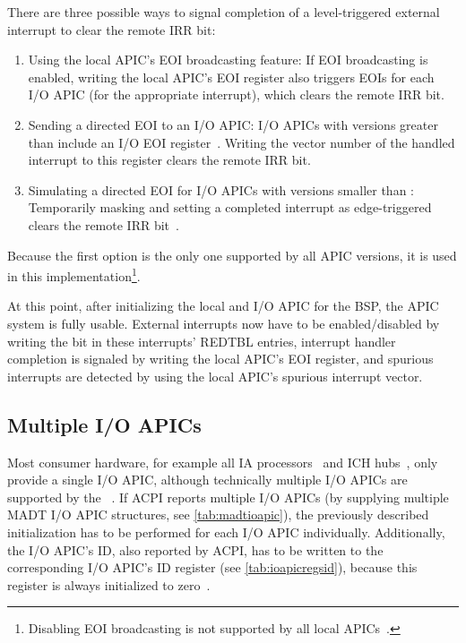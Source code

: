 There are three possible ways to signal completion of a level-triggered external interrupt to clear the remote IRR bit:

\begin{enumerate}
  \item Using the local APIC's EOI broadcasting feature: If EOI broadcasting is enabled, writing the local APIC's EOI register also triggers EOIs for each I/O APIC (for the appropriate interrupt), which clears the remote IRR bit.
  \item Sending a directed EOI to an I/O APIC\@: I/O APICs with versions greater than  include an I/O EOI register~\autocite[sec.~9.5.5]{ich5}.
        Writing the vector number of the handled interrupt to this register clears the remote IRR bit.
  \item Simulating a directed EOI for I/O APICs with versions smaller than : Temporarily masking and setting a completed interrupt as edge-triggered clears the remote IRR bit~\autocite[io\textunderscore{}apic.c]{linux}.
\end{enumerate}

Because the first option is the only one supported by all APIC versions, it is used in this implementation\footnote{
  Disabling EOI broadcasting is not supported by all local APICs~\autocite[sec.~3.11.8.5]{ia32}.}.

At this point, after initializing the local and I/O APIC for the BSP, the APIC system is fully usable.
External interrupts now have to be enabled/disabled by writing the  bit in these interrupts' REDTBL entries, interrupt handler completion is signaled by writing the local APIC's EOI register, and spurious interrupts are detected by using the local APIC's spurious interrupt vector.

\subsection{Multiple I/O APICs}
\label{subsec:multiioapic}

Most consumer hardware, for example all IA processors~\autocite{ia32} and ICH hubs~\autocite{ich5}, only provide a single I/O APIC, although technically multiple I/O APICs are supported by the ~\autocite[sec.~3.6.8]{mpspec}.
If ACPI reports multiple I/O APICs (by supplying multiple MADT I/O APIC structures, see \autoref{tab:madtioapic}), the previously described initialization has to be performed for each I/O APIC individually.
Additionally, the I/O APIC's ID, also reported by ACPI, has to be written to the corresponding I/O APIC's ID register (see \autoref{tab:ioapicregsid}), because this register is always initialized to zero~\autocite[sec.~9.5.6]{ich5}.

